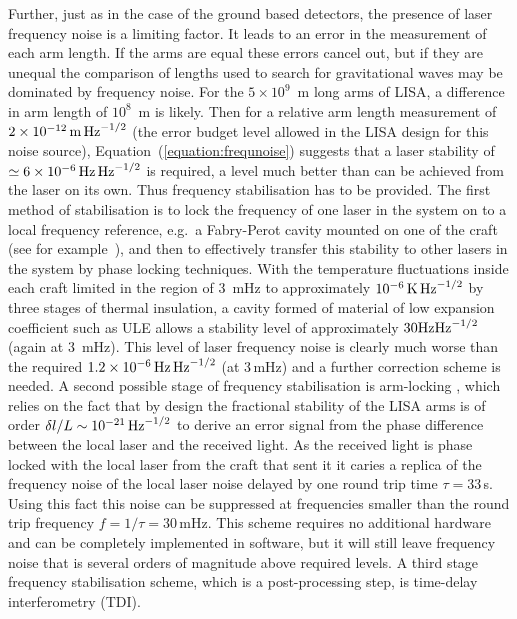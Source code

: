 \documentclass{article}
\begin{document}
Further, just as in the case of the ground based detectors, the presence of
laser frequency noise is a limiting factor. It leads to an error in the
measurement of each arm length. If the arms are equal these errors cancel out,
but if they are unequal the comparison of lengths used to search for
gravitational waves may be dominated by frequency noise. For the $5\times10^9$~m
long arms of LISA, a difference in arm length of $10^8$~m is likely. Then for a
relative arm length measurement of $2 \times 10^{-12}\,{\rm m}\,{\rm Hz}^{-1/2}$
(the error budget level allowed in the LISA design for this noise source),
Equation~(\ref{equation:frequnoise}) suggests that a laser stability of $\simeq
6 \times 10^{-6}\,{\rm Hz}\,{\rm Hz}^{-1/2}$ is required, a level much better
than can be achieved from the laser on its own. Thus frequency stabilisation has
to be provided. The first method of stabilisation is to lock the frequency of
one laser in the system on to a local frequency reference, e.g.\ a Fabry-Perot
cavity mounted on one of the craft (see for example~\cite{McNamara}), and then
to effectively transfer this stability to other lasers in the system by phase
locking techniques. With the temperature fluctuations inside each craft limited
in the region of 3~mHz to approximately $10^{-6}\,{\rm K}\,{\rm Hz}^{-1/2}$ by
three stages of thermal insulation, a cavity formed of material of low expansion
coefficient such as ULE allows a stability level of approximately $30 {\rm
Hz}{\rm Hz}^{-1/2}$ (again at 3~mHz). This level of laser frequency noise is
clearly much worse than the required $1.2 \times 10^{-6}\,{\rm Hz}\,{\rm
Hz}^{-1/2}$ (at 3\,mHz) and a further correction scheme is needed. A second
possible stage of frequency stabilisation is arm-locking \cite{Sheard:2003},
which relies on the fact that by design the fractional stability of the LISA
arms is of order $\delta{}l/L \sim 10^{-21}\,{\rm Hz}^{-1/2}$ to derive an error
signal from the phase difference between the local laser and the received light.
As the received light is phase locked with the local laser from the craft that
sent it it caries a replica of the frequency noise of the local laser noise
delayed by one round trip time $\tau=33$\,s. Using this fact this noise can be
suppressed at frequencies smaller than the round trip frequency $f= 1/\tau =
30$\,mHz. This scheme requires no additional hardware and can be completely
implemented in software, but it will still leave frequency noise that is several
orders of magnitude above required levels. A third stage frequency stabilisation
scheme, which is a post-processing step, is time-delay interferometry (TDI).
\end{document}
